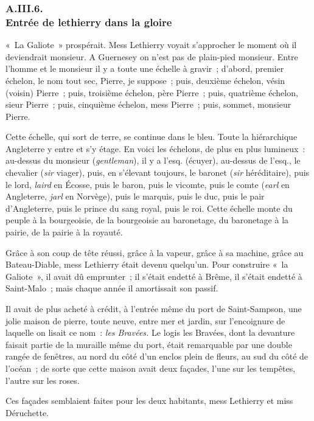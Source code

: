 \documentclass[french,twoside]{book} %
\begin{document}
 \subsubsection[{A.III.6. Entrée de lethierry dans la gloire}]{A.III.6. \\
Entrée de lethierry dans la gloire}
\noindent « La Galiote » prospérait. Mess Lethierry voyait s’approcher le moment où il deviendrait monsieur. A Guernesey on n’est pas de plain-pied monsieur. Entre l’homme et le monsieur il y a toute une échelle à gravir ; d’abord, premier échelon, le nom tout sec, Pierre, je suppose ; puis, deuxième échelon, vésin (voisin) Pierre ; puis, troisième échelon, père Pierre ; puis, quatrième échelon, sieur Pierre ; puis, cinquième échelon, mess Pierre ; puis, sommet, monsieur Pierre.\par
Cette échelle, qui sort de terre, se continue dans le bleu. Toute la hiérarchique Angleterre y entre et s’y étage. En voici les échelons, de plus en plus lumineux : au-dessus du monsieur (\emph{gentleman}), il y a l’esq. (écuyer), au-dessus de l’esq., le chevalier (\emph{sir} viager), puis, en s’élevant toujours, le baronet (\emph{sir} héréditaire), puis le lord, \emph{laird} en Écosse, puis le baron, puis le vicomte, puis le comte (\emph{earl} en Angleterre, \emph{jarl} en Norvège), puis le marquis, puis le duc, puis le pair  d’Angleterre, puis le prince du sang royal, puis le roi. Cette échelle monte du peuple à la bourgeoisie, de la bourgeoisie au baronetage, du baronetage à la pairie, de la pairie à la royauté.\par
Grâce à son coup de tête réussi, grâce à la vapeur, grâce à sa machine, grâce au Bateau-Diable, mess Lethierry était devenu quelqu’un. Pour construire « la Galiote », il avait dû emprunter ; il s’était endetté à Brême, il s’était endetté à Saint-Malo ; mais chaque année il amortissait son passif.\par
Il avait de plus acheté à crédit, à l’entrée même du port de Saint-Sampson, une jolie maison de pierre, toute neuve, entre mer et jardin, sur l’encoignure de laquelle on lisait ce nom : \emph{les Bravées.} Le logis les Bravées, dont la devanture faisait partie de la muraille même du port, était remarquable par une double rangée de fenêtres, au nord du côté d’un enclos plein de fleurs, au sud du côté de l’océan ; de sorte que cette maison avait deux façades, l’une sur les tempêtes, l’autre sur les roses.\par
Ces façades semblaient faites pour les deux habitants, mess Lethierry et miss Déruchette.\par
\end{document}
